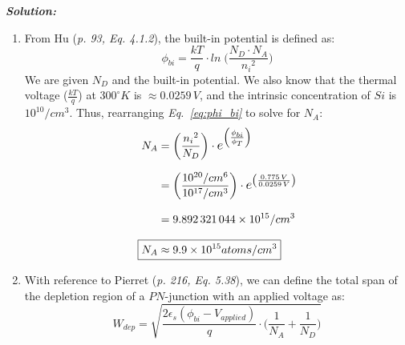 \documentclass[12pt, fleqn]{article}
\begin{document}
\newpage\noindent
\textbf{\emph{Solution: }}

\begin{enumerate}[label=(\alph*)]
    \item
        {
        From Hu\cite{hu} (\textit{p. 93, Eq. 4.1.2}), the built-in potential is defined as:
        \begin{equation}
            \phi_{bi} = \frac{kT}{q} \cdot ln\;\bigg( \frac{N_D \cdot N_A}{{n_i}^2} \bigg)
            \label{eq:phi_bi}
        \end{equation}
        We are given $N_D$ and the built-in potential.  We also know that the thermal voltage ($\frac{kT}{q}$) at $300^\circ K$ is $\approx 0.0259\,V$, and the intrinsic concentration of $Si$ is $10^{10} / cm^3$.  Thus, rearranging \textit{Eq.~\ref{eq:phi_bi}} to solve for $N_A$:
        \begin{align*}
            N_A &= \left(\frac{{n_i}^2}{N_D}\right)
                        \cdot \mathlarger{e^{\left(\frac{\phi_{bi}}{\phi_T}\right)}}\\[0.25cm]
            &= \left(\frac{10^{20}/cm^6}{10^{17}/cm^3}\right)
                        \cdot \mathlarger{e^{\left(\frac{0.775\,V}{0.0259\,V}\right)}}\\[0.25cm]
            &= \num{9.892321044e15}/cm^3\\[0.25cm]
            \Aboxed{N_A &\approx \num{9.9e15}atoms/cm^3}
        \end{align*}
        }
    \newpage\noindent
    \item
        {
        With reference to Pierret\cite{pierret} (\textit{p. 216, Eq. 5.38}), we can define the total span of the depletion region of a $PN$-junction with an applied voltage as:
        \begin{equation}
            W_{dep} = \sqrt{\frac{2\epsilon_s \left(\phi_{bi} - V_{applied}\right)}{q}
                            \cdot \Bigg( \frac{1}{N_A} + \frac{1}{N_D} \Bigg)}
            \label{eq:total_dep}
        \end{equation}        
        }
        

\end{enumerate}
\end{document}
